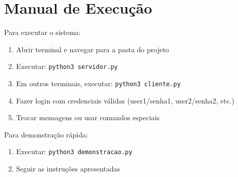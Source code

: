 \documentclass[12pt,a4paper]{article}
\begin{document}
\section{Manual de Execução}

Para executar o sistema:

\begin{enumerate}
    \item Abrir terminal e navegar para a pasta do projeto
    \item Executar: \texttt{python3 servidor.py}
    \item Em outros terminais, executar: \texttt{python3 cliente.py}
    \item Fazer login com credenciais válidas (user1/senha1, user2/senha2, etc.)
    \item Trocar mensagens ou usar comandos especiais
\end{enumerate}

Para demonstração rápida:
\begin{enumerate}
    \item Executar: \texttt{python3 demonstracao.py}
    \item Seguir as instruções apresentadas
\end{enumerate}
\end{document}

